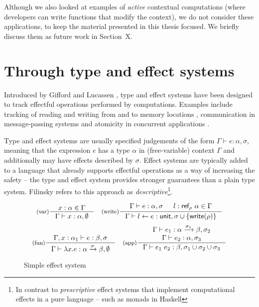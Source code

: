 Although we also looked at examples of \emph{active} contextual computations (where developers can
write functions that modify the context), we do not consider these applications, to keep the 
material presented in this thesis focused. We briefly discuss them as future work in Section~X.


\section{Through type and effect systems}
\label{sec:path-eff}

Introduced by Gifford and Lucassen \cite{effects-gifford,effects-polymorphic}, type and effect 
systems have been designed to track effectful operations performed by computations. Examples 
include tracking of reading and writing from and to memory locations \cite{effects-talpin-et-al}, 
communication in message-passing systems \cite{effects-messagepassing} and atomicity in concurrent 
applications \cite{effects-atomicity}.

Type and effect systems are usually specified judgements of the form $\Gamma \vdash e : \alpha, \sigma$, 
meaning that the expression $e$ has a type $\alpha$ in (free-variable) context $\Gamma$ and 
additionally may have effects described by $\sigma$. Effect systems are typically added to a 
language that already supports effectful operations as a way of increasing the safety -- the type
and effect system provides stronger guarantees than a plain type system. Filinsky 
\cite{effects-comprehensive} refers to this approach as \emph{descriptive}\footnote{In contrast
to \emph{prescriptive} effect systems that implement computational effects in a pure language 
-- such as monads in Haskell}.


\begin{figure}[t]
\begin{equation*}
\inference[(var)]
  {x:\alpha \in \Gamma }
  {\Gamma \vdash x : \alpha, \emptyset }
\quad
\inference[(write)]
  {\Gamma \vdash e : \alpha, \sigma & l:\ident{ref}_\rho~\alpha\in \Gamma}
  {\Gamma \vdash l \leftarrow e : \ident{unit}, \sigma \cup \{\ident{write}(\rho)\} }
\end{equation*}
\begin{equation*}
\inference[(fun)]
  {\Gamma, x:\alpha_1 \vdash e : \beta, \sigma }
  {\Gamma \vdash \lambda x.e : \alpha \xrightarrow{\sigma} \beta, \emptyset }
\quad  
\inference[(app)]
  {\Gamma \vdash e_1 : \alpha \xrightarrow{\sigma_1} \beta, \sigma_2 \\
   \Gamma \vdash e_2 : \alpha, \sigma_3 }
  {\Gamma \vdash e_1~e_2 : \beta, \sigma_1 \cup \sigma_2 \cup \sigma_3 }
\end{equation*}

\caption{Simple effect system}
\label{fig:path-eff}
\end{figure}

